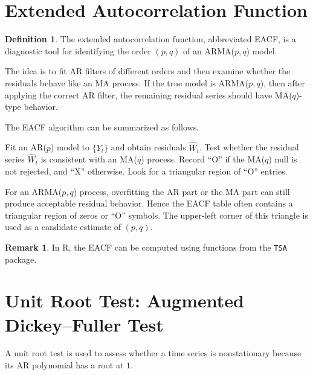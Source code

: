 \documentclass[12pt,oneside]{book}
\numberwithin{equation}{section}
\theoremstyle{definition}
\newtheorem{definition}{Definition}[section]
\newtheorem{remark}{Remark}[section]
\theoremstyle{plain}
\theoremstyle{remark}
\begin{document}
\section{Extended Autocorrelation Function}

\begin{definition}
The extended autocorrelation function, abbreviated EACF, is a diagnostic tool for identifying the order $(p,q)$ of an ARMA($p,q$) model.
\end{definition}

The idea is to fit AR filters of different orders and then examine whether the residuals behave like an MA process. If the true model is ARMA($p,q$), then after applying the correct AR filter, the remaining residual series should have MA($q$)-type behavior.

The EACF algorithm can be summarized as follows.

\begin{algorithm}[H]
\caption{EACF Order Identification}
\begin{algorithmic}[1]
    \State Fit an AR($p$) model to $\{Y_t\}$ and obtain residuals $\widehat{W}_t$.
        \State Test whether the residual series $\widehat{W}_t$ is consistent with an MA($q$) process.
        \State Record ``O'' if the MA($q$) null is not rejected, and ``X'' otherwise.
    \EndFor
\EndFor
\State Look for a triangular region of ``O'' entries.
\end{algorithmic}
\end{algorithm}

For an ARMA($p,q$) process, overfitting the AR part or the MA part can still produce acceptable residual behavior. Hence the EACF table often contains a triangular region of zeros or ``O'' symbols. The upper-left corner of this triangle is used as a candidate estimate of $(p,q)$.

\begin{remark}
In R, the EACF can be computed using functions from the \texttt{TSA} package.
\end{remark}

\section{Unit Root Test: Augmented Dickey--Fuller Test}

A unit root test is used to assess whether a time series is nonstationary because its AR polynomial has a root at $1$.
\end{document}
